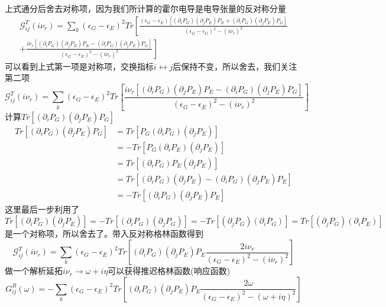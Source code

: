 \documentclass{article}
\numberwithin{equation}{subsection}
\begin{document}
上式通分后舍去对称项，因为我们所计算的霍尔电导是电导张量的反对称分量
\begin{equation}
    \begin{split}
        \mathcal{G}_{ij}^T(i\nu_r)=\sum_{k}(\epsilon_G-\epsilon_E)^2Tr\left[\frac{(\epsilon_G-\epsilon_E)[(\partial_i P_G)(\partial_j P_E)P_E+(\partial_i P_G)(\partial_j P_E)P_G]}{(\epsilon_G-\epsilon_G)^2-(i\nu_r)^2}\right.\\
        \left.+\frac{i\nu_r[(\partial_i P_G)(\partial_j P_E)P_E-(\partial_i P_G)(\partial_j P_E)P_G]}{(\epsilon_G-\epsilon_E)^2-(i\nu_r)^2}\right]
    \end{split}
\end{equation}
可以看到上式第一项是对称项，交换指标$i\leftrightarrow j$后保持不变，所以舍去，我们关注第二项
\begin{equation}
    \mathcal{G}_{ij}^T(i\nu_r)=\sum_{k}(\epsilon_G-\epsilon_E)^2Tr\left[\frac{i\nu_r[(\partial_i P_G)(\partial_j P_E)P_E-(\partial_i P_G)(\partial_j P_E)P_G]}{(\epsilon_G-\epsilon_E)^2-(i\nu_r)^2}\right]
\end{equation}
计算$Tr[(\partial_i P_G)(\partial_j P_E)P_G]$
\begin{equation}
    \begin{split}
        Tr[(\partial_i P_G)(\partial_j P_E)P_G]&=Tr[P_G(\partial_i P_G)(\partial_j P_E)]\\
        &=-Tr[P_G(\partial_i P_E)(\partial_j P_E)]\\
        &=Tr[(\partial_i P_G)P_E(\partial_j P_E)]\\
        &=Tr[(\partial_i P_G)(\partial_j P_E)-(\partial_i P_G)(\partial_j P_E)P_E]\\
        &=-Tr[(\partial_i P_G)(\partial_j P_E)P_E]
    \end{split}
\end{equation}
这里最后一步利用了$Tr[(\partial_i P_G)(\partial_j P_E)]=-Tr[(\partial_i P_G)(\partial_j P_G)]=-Tr[(\partial_j P_G)(\partial_i P_G)]=Tr[(\partial_j P_G)(\partial_i P_E)]$是一个对称项，所以舍去了。带入反对称格林函数得到
\begin{equation}
    \mathcal{G}_{ij}^T(i\nu_r)=\sum_{k}(\epsilon_G-\epsilon_E)^2Tr\left[(\partial_i P_G)(\partial_j P_E)P_E\frac{2i\nu_r}{(\epsilon_G-\epsilon_E)^2-(i\nu_r)^2}\right]
\end{equation}
做一个解析延拓$i\nu_r\rightarrow\omega+i\eta$可以获得推迟格林函数(响应函数)
\begin{equation}
    G_{ij}^R(\omega)=-\sum_{k}(\epsilon_G-\epsilon_E)^2Tr\left[(\partial_i P_G)(\partial_j P_E)P_E\frac{2\omega}{(\epsilon_G-\epsilon_E)^2-(\omega+i\eta)^2}\right]
\end{equation}
\end{document}
